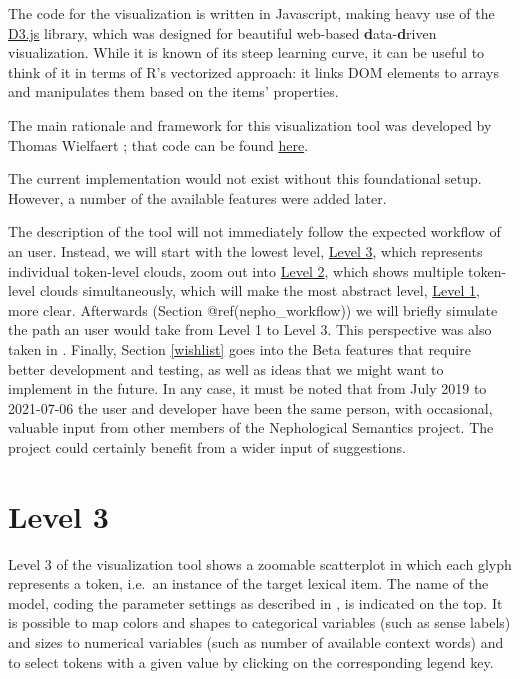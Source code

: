 \documentclass[
]{book}
\begin{document}
The code for the visualization is written in Javascript, making heavy use of the
\href{https://d3.js}{D3.js} library, which was designed for beautiful web-based
\textbf{d}ata-\textbf{d}riven visualization. While it is known of its steep learning curve,
it can be useful to think of it in terms of R's vectorized approach: it links
DOM elements to arrays and manipulates them based on the items' properties.

The main rationale and framework for this visualization tool was developed by
Thomas Wielfaert \autocite{wielfaert.etal_2019}; that code can be found
\href{https://github.com/tokenclouds/tokenclouds.github.io/LeTok/}{here}.

The current implementation would not exist without this foundational setup. However,
a number of the available features were added later.

The description of the tool will not immediately follow the expected workflow of an user.
Instead, we will start with the lowest level, \protect\hyperlink{level_3}{Level 3},
which represents individual token-level clouds,
zoom out into \protect\hyperlink{level_2}{Level 2}, which shows multiple token-level clouds simultaneously,
which will make the most abstract level, \protect\hyperlink{level_1}{Level 1}, more clear.
Afterwards (Section @ref(nepho\_workflow)) we will briefly simulate the path an user would take from Level 1 to Level 3.
This perspective was also taken in \textcite{montes.heylen_Submitted}.
Finally, Section \ref{wishlist} goes into the Beta features
that require better development and testing, as well as ideas that we might want to
implement in the future. In any case, it must be noted that from July 2019 to
2021-07-06 the user and developer have been the same person, with occasional,
valuable input from other members of the Nephological Semantics project. The
project could certainly benefit from a wider input of suggestions.

\hypertarget{level_3}{%
\section{Level 3}\label{level_3}}

Level 3 of the visualization tool shows a zoomable scatterplot in which each glyph represents a token, i.e.~an instance of the target lexical item. The name of the model, coding the parameter settings as described in
, is indicated on the top. It is possible to map colors and shapes to categorical variables (such as sense labels) and sizes to numerical variables (such as number of available context words) and to select tokens with a given value by clicking on the corresponding legend key.
\end{document}
